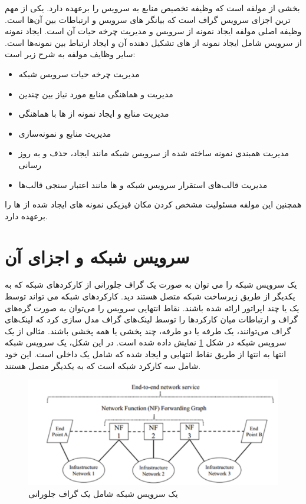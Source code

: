  بخشی از مولفه  است که وظیفه تخصیص منابع به سرویس را برعهده دارد.
یکی از مهم ترین اجزای سرویس گراف  است که بیانگر  های سرویس و ارتباطات بین آن‌ها است.
وظیفه اصلی مولفه  ایجاد نمونه از سرویس و مدیریت چرخه حیات آن است.
ایجاد نمونه از سرویس شامل ایجاد نمونه از ‌های تشکیل دهنده آن و ایجاد ارتباط بین نمونه‌ها است.
سایر وظایف مولفه  به شرح زیر است:
\begin{itemize}
    \item مدیریت چرخه حیات سرویس شبکه
    \item مدیریت و هماهنگی منابع مورد نیاز  بین چندین 
    \item مدیریت منابع و ایجاد نمونه از ‌ها با هماهنگی 
    \item مدیریت منابع و نمونه‌سازی 
    \item مدیریت همبندی نمونه ساخته شده از سرویس شبکه مانند ایجاد، حذف و به روز رسانی 
    \item مدیریت قالب‌های استقرار سرویس شبکه و ها مانند اعتبار سنجی قالب‌ها
\end{itemize}
همچنین این مولفه مسئولیت مشخص کردن مکان فیزیکی نمونه های ایجاد شده از ها را برعهده دارد.

\section{سرویس شبکه و اجزای آن}
یک سرویس شبکه را می توان به صورت یک گراف جلورانی از کارکردهای شبکه
که به یکدیگر از طریق زیرساخت شبکه متصل هستند دید.
کارکردهای شبکه می تواند توسط یک یا چند اپراتور ارائه شده باشند.
نقاط انتهایی سرویس را می‌توان به صورت گره‌های گراف و
ارتباطات میان کارکردها را توسط لینک‌های گراف مدل سازی کرد
که لینک‌های گراف می‌توانند، یک طرفه یا دو طرفه، چند پخشی یا همه پخشی باشند.
مثالی از یک سرویس شبکه در شکل
\ref{fig.18}
نمایش داده شده است.
در این شکل، یک سرویس شبکه انتها به انتها از طریق نقاط انتهایی  و  ایجاد شده که شامل یک  داخلی است.
این  خود شامل سه کارکرد شبکه است که به یکدیگر متصل هستند.


\begin{figure}[h!]
\center\includegraphics[scale=.5]{images/network-service}
\caption{یک سرویس شبکه شامل یک گراف جلورانی}
\label{fig.18}
\end{figure}

